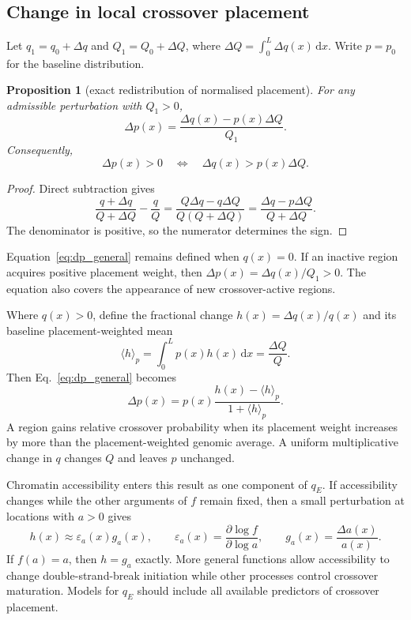 \documentclass[11pt]{article}
\newtheorem{proposition}{Proposition}
\theoremstyle{remark}
\newcommand{\dd}{\,\mathrm{d}}
\newcommand{\avg}[1]{\langle #1 \rangle}
\begin{document}
\subsection{Change in local crossover placement}
\label{sec:shape}

Let $q_1=q_0+\Delta q$ and $Q_1=Q_0+\Delta Q$, where
$\Delta Q=\int_0^L\Delta q(x)\dd x$. Write $p=p_0$ for the baseline distribution.

\begin{proposition}[exact redistribution of normalised placement]
\label{prop:placement}
For any admissible perturbation with $Q_1>0$,
\begin{equation}
\boxed{\;
\Delta p(x)
=\frac{\Delta q(x)-p(x)\Delta Q}{Q_1}.
\;}
\label{eq:dp_general}
\end{equation}
Consequently,
\begin{equation}
\Delta p(x)>0
\quad\Longleftrightarrow\quad
\Delta q(x)>p(x)\Delta Q.
\label{eq:dp_sign_general}
\end{equation}
\end{proposition}

\begin{proof}
Direct subtraction gives
\[
\frac{q+\Delta q}{Q+\Delta Q}-\frac{q}{Q}
=\frac{Q\Delta q-q\Delta Q}{Q(Q+\Delta Q)}
=\frac{\Delta q-p\Delta Q}{Q+\Delta Q}.
\]
The denominator is positive, so the numerator determines the sign.
\end{proof}

Equation~\eqref{eq:dp_general} remains defined when $q(x)=0$. If an inactive
region acquires positive placement weight, then
$\Delta p(x)=\Delta q(x)/Q_1>0$. The equation also covers the appearance of new
crossover-active regions.

Where $q(x)>0$, define the fractional change $h(x)=\Delta q(x)/q(x)$ and its
baseline placement-weighted mean
\begin{equation}
\avg{h}_p=\int_0^L p(x)h(x)\dd x=\frac{\Delta Q}{Q}.
\end{equation}
Then Eq.~\eqref{eq:dp_general} becomes
\begin{equation}
\boxed{\;
\Delta p(x)
=p(x)\frac{h(x)-\avg{h}_p}{1+\avg{h}_p}.
\;}
\label{eq:dp_fractional}
\end{equation}
A region gains relative crossover probability when its placement weight increases
by more than the placement-weighted genomic average. A uniform multiplicative
change in $q$ changes $Q$ and leaves $p$ unchanged.

Chromatin accessibility enters this result as one component of $q_E$. If
accessibility changes while the other arguments of $f$ remain fixed, then a small
perturbation at locations with $a>0$ gives
\begin{equation}
h(x)
\approx
\varepsilon_a(x)g_a(x),
\qquad
\varepsilon_a(x)=\frac{\partial\log f}{\partial\log a},
\qquad
g_a(x)=\frac{\Delta a(x)}{a(x)}.
\label{eq:elasticity}
\end{equation}
If $f(a)=a$, then $h=g_a$ exactly. More general functions allow accessibility to
change double-strand-break initiation while other processes control crossover
maturation. Models for $q_E$ should include all available predictors of crossover placement.
\end{document}

